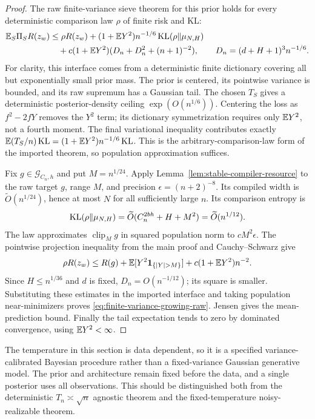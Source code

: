 \begin{proof}
The raw finite-variance sieve theorem for this prior\cite{rawprior}
holds for every deterministic comparison law $\rho$ of finite risk and KL:
\begin{align*}
 \mathbb E_S\Pi_S R(z_w)
 &\le\rho R(z_w)+(1+\mathbb E Y^2)n^{-1/6}\operatorname{KL}(\rho\|\mu_{N,H})\\
 &\quad+c(1+\mathbb E Y^2)(D_n+D_n^2+(n+1)^{-2}),\qquad
 D_n=(d+H+1)^3n^{-1/6}.
\end{align*}
For clarity, this interface comes from a deterministic finite dictionary
covering all but exponentially small prior mass.  The prior is centered,
its pointwise variance is bounded, and its raw supremum has a Gaussian
tail.  The chosen $T_S$ gives a deterministic posterior-density ceiling
$\exp(O(n^{1/6}))$.  Centering the loss as $f^2-2fY$ removes the $Y^2$
term; its dictionary symmetrization requires only $\mathbb E Y^2$, not a fourth
moment.  The final variational inequality contributes exactly
$\mathbb E(T_S/n)\operatorname{KL}=(1+\mathbb E Y^2)n^{-1/6}\operatorname{KL}$.
This is the arbitrary-comparison-law form of the imported theorem, so
population approximation suffices.

Fix $g\in\mathcal G_{C_n,h}$ and put $M=n^{1/24}$.  Apply
Lemma~\ref{lem:stable-compiler-resource} to the raw target $g$, range $M$,
and precision $\epsilon=(n+2)^{-8}$.  Its compiled width is
$\widetilde O(n^{1/24})$, hence at most $N$ for all sufficiently large
$n$.  Its comparison entropy is
\[
 \operatorname{KL}(\rho\|\mu_{N,H})
 =\widetilde O(C_n^{2bh}+H+M^2)
 =\widetilde O(n^{1/12}).
\]
The law approximates $\operatorname{clip}_M g$ in squared population
norm to $cM^2\epsilon$.  The pointwise projection inequality from the
main proof and Cauchy--Schwarz give
\[
 \rho R(z_w)\le R(g)
  +\E[Y^2\mathbf1_{\{|Y|>M\}}]
  +c(1+\E Y^2)n^{-2}.
\]
Since $H\le n^{1/36}$ and $d$ is fixed,
$D_n=O(n^{-1/12})$; its square is smaller.  Substituting these estimates
in the imported interface and taking population near-minimizers proves
\eqref{eq:finite-variance-growing-raw}.  Jensen gives the mean-prediction
bound.  Finally the tail expectation tends to zero by dominated
convergence, using $\mathbb E Y^2<\infty$.
\end{proof}

The temperature in this section is data dependent, so it is a specified
variance-calibrated Bayesian procedure rather than a fixed-variance
Gaussian generative model.  The prior and architecture remain fixed
before the data, and a single posterior uses all observations.  This
should be distinguished both from the deterministic $T_n\asymp\sqrt n$
agnostic theorem and the fixed-temperature noisy-realizable theorem.
